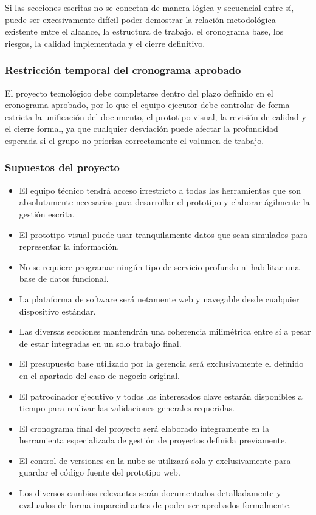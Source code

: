 \documentclass[11pt,spanish]{article}
\begin{document}
Si las secciones escritas no se conectan de manera lógica y secuencial entre sí, puede ser excesivamente difícil poder demostrar la relación metodológica existente entre el alcance, la estructura de trabajo, el cronograma base, los riesgos, la calidad implementada y el cierre definitivo.

\subsubsection{Restricción temporal del cronograma aprobado}

El proyecto tecnológico debe completarse dentro del plazo definido en el cronograma aprobado, por lo que el equipo ejecutor debe controlar de forma estricta la unificación del documento, el prototipo visual, la revisión de calidad y el cierre formal, ya que cualquier desviación puede afectar la profundidad esperada si el grupo no prioriza correctamente el volumen de trabajo.

\subsubsection{Supuestos del proyecto}

\begin{itemize}
    \item El equipo técnico tendrá acceso irrestricto a todas las herramientas que son absolutamente necesarias para desarrollar el prototipo y elaborar ágilmente la gestión escrita.
    \item El prototipo visual puede usar tranquilamente datos que sean simulados para representar la información.
    \item No se requiere programar ningún tipo de servicio profundo ni habilitar una base de datos funcional.
    \item La plataforma de software será netamente web y navegable desde cualquier dispositivo estándar.
    \item Las diversas secciones mantendrán una coherencia milimétrica entre sí a pesar de estar integradas en un solo trabajo final.
    \item El presupuesto base utilizado por la gerencia será exclusivamente el definido en el apartado del caso de negocio original.
    \item El patrocinador ejecutivo y todos los interesados clave estarán disponibles a tiempo para realizar las validaciones generales requeridas.
    \item El cronograma final del proyecto será elaborado íntegramente en la herramienta especializada de gestión de proyectos definida previamente.
    \item El control de versiones en la nube se utilizará sola y exclusivamente para guardar el código fuente del prototipo web.
    \item Los diversos cambios relevantes serán documentados detalladamente y evaluados de forma imparcial antes de poder ser aprobados formalmente.
\end{itemize}
\end{document}
